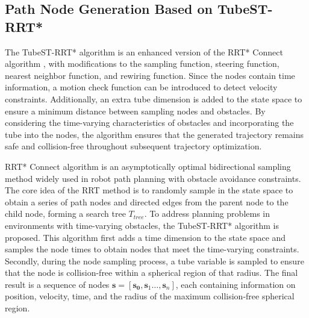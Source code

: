 \documentclass[conference]{IEEEtran}
\begin{document}
    \subsection{Path Node Generation Based on TubeST-RRT*}
    The TubeST-RRT* algorithm is an enhanced version of the RRT* Connect \cite{b7} algorithm , with modifications to the sampling function, steering function, nearest neighbor function, and rewiring function. Since the nodes contain time information, a motion check function can be introduced to detect velocity constraints. Additionally, an extra tube dimension is added to the state space to ensure a minimum distance between sampling nodes and obstacles. By considering the time-varying characteristics of obstacles and incorporating the tube into the nodes, the algorithm ensures that the generated trajectory remains safe and collision-free throughout subsequent trajectory optimization.
    
    RRT* Connect algorithm is an asymptotically optimal bidirectional sampling method widely used in robot path planning with obstacle avoidance constraints. The core idea of the RRT method is to randomly sample in the state space to obtain a series of path nodes and directed edges from the parent node to the child node, forming a search tree ${T}_{tree }$. To address planning problems in environments with time-varying obstacles, the TubeST-RRT* algorithm is proposed. This algorithm first adds a time dimension to the state space and samples the node times to obtain nodes that meet the time-varying constraints. Secondly, during the node sampling process, a tube variable is sampled to ensure that the node is collision-free within a spherical region of that radius. The final result is a sequence of nodes $\boldsymbol{s} = [\boldsymbol{s_{0}},\boldsymbol{s}_{1}\dots{},\boldsymbol{s}_{n}]$, each containing information on position, velocity, time, and the radius of the maximum collision-free spherical region. 
\end{document}
